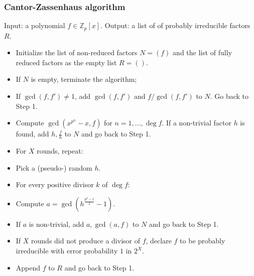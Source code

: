 \begin{frame}
\footnotesize
\frametitle{Cantor-Zassenhaus algorithm}
Input: a polynomial $f\in \mathbb Z_p[x]$. Output: a list of of probably irreducible factors $R$.
\begin{itemize}
\item<2->[0] Initialize the list of non-reduced factors  $N=(f)$ and the list of fully reduced factors as the empty list $R=()$. 
\item<3->[1] If $N$ is empty, terminate the algorithm;
\item<5->[2]  If $\gcd(f,f')\neq 1$, add $\gcd(f,f')$ and $f/\gcd(f,f')$ to $N$. Go back to Step 1.
\item<6->[3] Compute $\gcd (x^{p^n}-x, f)$ for $n=1,..., \deg f$. If a non-trivial factor $h$ is found, add $h,\frac{f}{h}$ to $N$ and go back to Step 1.
\item<7->[4] For $X$ rounds, repeat:
\item<8->[4.1] Pick a (pseudo-) random $h$.
\item<9->[4.2] For every positive divisor $k$ of $\deg f$:
\item<10->[4.2.1] Compute $a=\gcd \left(h^{\frac{p^k-1}{2}}-1 \right)$.
\item<11->[4.2.2] If $a$ is non-trivial, add $a,\gcd(a,f)$ to $N$ and go back to Step 1.
\item<12->[5] If $X$ rounds did not produce a divisor of $f$, declare $f$ to be probably irreducible with error probability $1$ in $2^X$. 
\item<13->[6] Append $f$ to $R$ and go back to Step 1.
\end{itemize}
\end{frame}